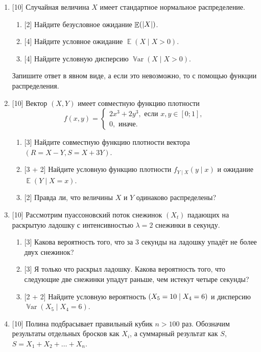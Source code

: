 \documentclass[12pt]{article}
\DeclareMathOperator{\Var}{\mathbb{V}ar}
\let\P\relax
\DeclareMathOperator{\P}{\mathbb{P}}
\DeclareMathOperator{\E}{\mathbb{E}}
\DeclarePairedDelimiter{\abs}{\lvert}{\rvert}
\begin{document}
\begin{enumerate}
    \item {[10]} Случайная величина $X$ имеет стандартное нормальное распределение. 
    \begin{enumerate}
        \item {[2]} Найдите безусловное ожидание $\E(\abs{X})$.
        \item {[4]} Найдите условное ожидание $\E(X \mid X > 0)$.
        \item {[4]} Найдите условную дисперсию $\Var(X \mid X > 0)$.
    \end{enumerate}

    Запишите ответ в явном виде, а если это невозможно, то с помощью функции распределения. 

    \item {[10]} Вектор $(X, Y)$ имеет совместную функцию плотности 
    \[
    f(x, y) = \begin{cases}
        2x^3 + 2y^3, \text{ если } x, y \in [0;1], \\
        0, \text{ иначе.}
    \end{cases}
    \]
    \begin{enumerate}
        \item {[3]} Найдите совместную функцию плотности вектора $(R = X - Y, S = X + 3Y)$.
        \item {[3 + 2]} Найдите условную функцию плотности $f_{Y\mid X}(y \mid x)$ и ожидание $\E(Y\mid X = x)$.
        \item {[2]} Правда ли, что величины $X$ и $Y$ одинаково распределены?
    \end{enumerate}

    \item {[10]} Рассмотрим пуассоновский поток снежинок $(X_t)$ падающих на раскрытую ладошку с интенсивностью $\lambda = 2$ снежинки в секунду.
\begin{enumerate}
    \item {[3]} Какова вероятность того, что за $3$ секунды на ладошку упадёт не более двух снежинок?
    \item {[3]} Я только что раскрыл ладошку. Какова вероятность того, что следующие две снежинки упадут раньше, чем истекут четыре секунды?
    \item {[2 + 2]} Найдите условную вероятность $\P(X_{5} = 10 \mid X_{4} = 6)$ и дисперсию $\Var(X_{5} \mid X_4 = 6)$.
\end{enumerate}

    \item {[10]} Полина подбрасывает правильный кубик $n > 100$ раз. 
    Обозначим результаты отдельных бросков как $X_i$, а суммарный результат как $S$, $S = X_1 + X_2 + \dots + X_n$.


\end{enumerate}
\end{document}
